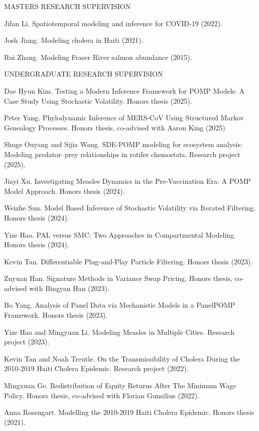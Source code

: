 \lsp

\begin{reflist}{MASTERS RESEARCH SUPERVISION}
\item{Jifan Li}. Spatiotemporal modeling and inference for COVID-19 (2022).
\item{Josh Jiang}. Modeling cholera in Haiti (2021).
\item{Rui Zhang}. Modeling Fraser River salmon abundance (2015).
\end{reflist}

\lsp
\begin{reflist}{UNDERGRADUATE RESEARCH SUPERVISION}
\item{Dae Hyun Kim}. Testing a Modern Inference Framework for POMP Models: A Case Study Using Stochastic Volatility. Honors thesis (2025).
  \item{Peter Yang}. Phylodynamic Inference of MERS-CoV Using Structured Markov Genealogy Processes. Honors thesis, co-advised with Aaron King (2025)
\item{Shuge Ouyang and Sijia Wang}. SDE-POMP modeling for ecosystem analysis:
Modeling predator–prey relationships in rotifer chemostats. Research project (2025).
\item{Jiayi Xu}. Investigating Measles Dynamics in the Pre-Vaccination Era: A POMP Model Approach. Honors thesis (2024).
\item{Weizhe Sun}. Model Based Inference of Stochastic Volatility via Iterated Filtering. Honors thesis (2024).
\item{Yize Hao}. PAL versus SMC: Two Approaches in Compartmental Modeling. Honors thesis (2024).
\item{Kevin Tan}. Differentiable Plug-and-Play Particle Filtering. Honors thesis (2023).
\item{Zuyuan Han}. Signature Methods in Variance Swap Pricing. Honors thesis, co-advised with Bingyan Han (2023).  
\item{Bo Yang}. Analysis of Panel Data via Mechanistic Models in a PanelPOMP Framework. Honors thesis (2023).
  \item{Yize Hao and Mingyuan Li}. Modeling Measles in Multiple Cities. Research project (2023).
\item{Kevin Tan and Noah Treutle}. On the Transmissibility of Cholera During the 2010-2019 Haiti Cholera Epidemic. Research project (2022).
\item{Mingxuan Ge}. Redistribution of Equity Returns After The Minimum Wage Policy. Honors thesis, co-advised with Florian Gunsilius (2022).
\item{Anna Rosengart}. Modelling the 2010-2019 Haiti Cholera Epidemic. Honors thesis (2021).

\end{reflist}
